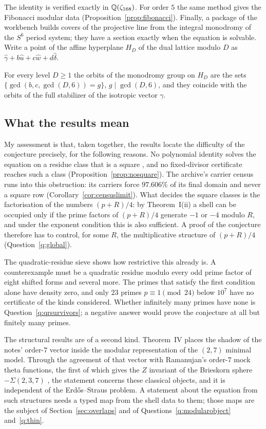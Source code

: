 The identity is verified exactly in $\mathbb{Q}(\zeta_{168})$. For order $5$ the same method gives the Fibonacci modular data (Proposition~\ref{prop:fibonacci}). Finally, a package of the workbench builds covers of the projective line from the integral monodromy of the $S^6$ period system; they have a section exactly when the equation is solvable. Write a point of the affine hyperplane $H_D$ of the dual lattice modulo $D$ as $\hat\gamma+b\hat u+c\hat w+d\hat\delta$.

\begin{introthm}
For every level $D\ge1$ the orbits of the monodromy group on $H_D$ are the sets $\{\gcd(b,c,\gcd(D,6))=g\}$, $g\mid\gcd(D,6)$, and they coincide with the orbits of the full stabilizer of the isotropic vector $\gamma$.
\end{introthm}

\subsection*{What the results mean}

My assessment is that, taken together, the results locate the difficulty of the conjecture precisely, for the following reasons. No polynomial identity solves the equation on a residue class that is a square \cite{ElsholtzTao}, and no fixed-divisor certificate reaches such a class (Proposition~\ref{prop:nosquare}). The archive's carrier census runs into this obstruction: its carriers force $97.606\%$ of its final domain and never a square row (Corollary~\ref{cor:censuslimit}). What decides the square classes is the factorisation of the numbers $(p+R)/4$: by Theorem~I(ii) a shell can be occupied only if the prime factors of $(p+R)/4$ generate $-1$ or $-4$ modulo $R$, and under the exponent condition this is also sufficient. A proof of the conjecture therefore has to control, for some $R$, the multiplicative structure of $(p+R)/4$ (Question~\ref{q:global}).

The quadratic-residue sieve shows how restrictive this already is. A counterexample must be a quadratic residue modulo every odd prime factor of eight shifted forms and several more. The primes that satisfy the first condition alone have density zero, and only $23$ primes $p\equiv1\pmod{24}$ below $10^7$ have no certificate of the kinds considered. Whether infinitely many primes have none is Question~\ref{q:qrsurvivors}; a negative answer would prove the conjecture at all but finitely many primes.

The structural results are of a second kind. Theorem~IV places the shadow of the notes' order-$7$ vector inside the modular representation of the $(2,7)$ minimal model. Through the agreement of that vector with Ramanujan's order-$7$ mock theta functions, the first of which gives the $\widehat Z$ invariant of the Brieskorn sphere $-\Sigma(2,3,7)$ \cite{CFS}, the statement concerns these classical objects, and it is independent of the Erdős--Straus problem. A statement about the equation from such structures needs a typed map from the shell data to them; those maps are the subject of Section~\ref{sec:overlaps} and of Questions~\ref{q:modularobject} and~\ref{q:thin}.

